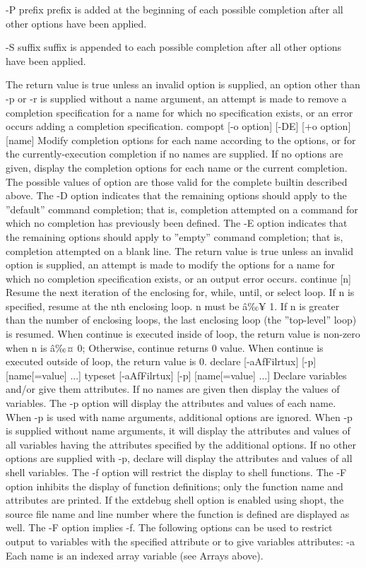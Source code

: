 -P prefix
prefix is added at the beginning of each possible completion after all other options have been applied.

-S suffix
suffix is appended to each possible completion after all other options have been applied.

The return value is true unless an invalid option is supplied, an option other than -p or -r is supplied without a name argument, an attempt is made to remove a completion specification for a name for which no specification exists, or an error occurs adding a completion specification.
compopt [-o option] [-DE] [+o option] [name]
Modify completion options for each name according to the options, or for the currently-execution completion if no names are supplied. If no options are given, display the completion options for each name or the current completion. The possible values of option are those valid for the complete builtin described above. The -D option indicates that the remaining options should apply to the ''default'' command completion; that is, completion attempted on a command for which no completion has previously been defined. The -E option indicates that the remaining options should apply to ''empty'' command completion; that is, completion attempted on a blank line.
The return value is true unless an invalid option is supplied, an attempt is made to modify the options for a name for which no completion specification exists, or an output error occurs.
continue [n]
Resume the next iteration of the enclosing for, while, until, or select loop. If n is specified, resume at the nth enclosing loop. n must be â‰¥ 1. If n is greater than the number of enclosing loops, the last enclosing loop (the ''top-level'' loop) is resumed. When continue is executed inside of loop, the return value is non-zero when n is â‰¤ 0; Otherwise, continue returns 0 value. When continue is executed outside of loop, the return value is 0.
declare [-aAfFilrtux] [-p] [name[=value] ...]
typeset [-aAfFilrtux] [-p] [name[=value] ...]
Declare variables and/or give them attributes. If no names are given then display the values of variables. The -p option will display the attributes and values of each name. When -p is used with name arguments, additional options are ignored. When -p is supplied without name arguments, it will display the attributes and values of all variables having the attributes specified by the additional options. If no other options are supplied with -p, declare will display the attributes and values of all shell variables. The -f option will restrict the display to shell functions. The -F option inhibits the display of function definitions; only the function name and attributes are printed. If the extdebug shell option is enabled using shopt, the source file name and line number where the function is defined are displayed as well. The -F option implies -f. The following options can be used to restrict output to variables with the specified attribute or to give variables attributes:
-a
Each name is an indexed array variable (see Arrays above).

